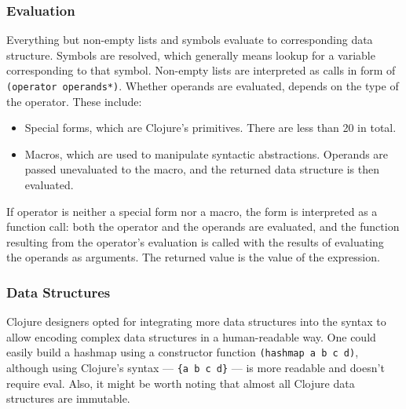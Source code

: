 \documentclass[english,mgr,shortabstract]{iithesis}
\begin{document}
\subsubsection{Evaluation}
Everything but non-empty lists and symbols evaluate to corresponding data
structure.
Symbols are resolved, which generally means lookup for a variable corresponding
to that symbol.
Non-empty lists are interpreted as calls in form of \lstinline|(operator operands*)|.
Whether operands are evaluated, depends on the type of the operator.
These include:
\begin{itemize}
  \item Special forms, which are Clojure’s primitives. There are  less than 20
    in total.
  \item Macros, which are used to manipulate syntactic abstractions. Operands
    are passed unevaluated to the macro, and the returned data structure is then
    evaluated.
\end{itemize}
If operator is neither a special form nor a macro, the form is interpreted as a
function call: both the operator and the operands are evaluated, and the
function resulting from the operator’s evaluation is called with the results of
evaluating the operands as arguments.
The returned value is the value of the expression.

\subsubsection{Data Structures}
Clojure designers opted for integrating more data structures into the syntax to
allow encoding complex data structures in a human-readable way.
One could easily build a hashmap using a constructor function
\lstinline$(hashmap a b c d)$, although using Clojure’s syntax ---
\lstinline${a b c d}$ --- is more readable and doesn’t require eval.
Also, it might be worth noting that almost all Clojure data structures are
immutable.
\end{document}
